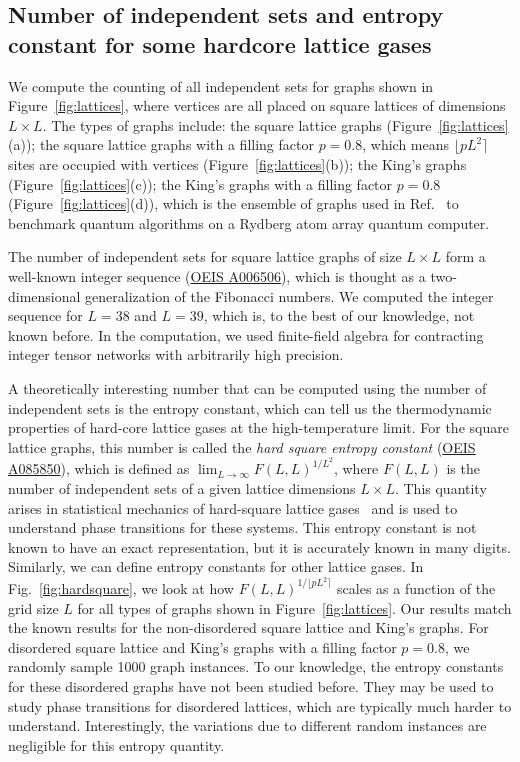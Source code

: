 \documentclass[onefignum, onetabnum]{siamart190516}
\newcommand{\<}{\langle}
\renewcommand{\>}{\rangle}
\newcommand{\Fig}[1]{Fig.~\ref{#1}}
\newcommand{\blue}[1]{[{\bf  \color{blue}{JG: #1}}]}
\newcounter{example}
\begin{document}
\subsection{Number of independent sets and entropy constant for some hardcore lattice gases}\label{sec:entropy}
We compute the counting of all independent sets for graphs shown in Figure~\ref{fig:lattices}, where vertices are all placed on square lattices of dimensions $L \times L$.
The types of graphs include: the square lattice graphs (Figure~\ref{fig:lattices}(a)); the square lattice graphs with a filling factor $p=0.8$, which means $\lfloor pL^{2} \rceil$ sites are occupied with vertices  (Figure~\ref{fig:lattices}(b));
the King's graphs  (Figure~\ref{fig:lattices}(c)); the King's graphs with a filling factor $p = 0.8$  (Figure~\ref{fig:lattices}(d)), which is the ensemble of graphs used in Ref.~\cite{Ebadi2022} to benchmark quantum algorithms on a Rydberg atom array quantum computer. 

The number of independent sets for square lattice graphs of size $L \times L$ form a well-known integer sequence (\href{https://oeis.org/A006506}{OEIS A006506}), which is thought as a two-dimensional generalization of the Fibonacci numbers.
We computed the integer sequence for $L=38$ and $L=39$, which is, to the best of our knowledge, not known before.
In the computation, we used finite-field algebra for contracting integer tensor networks with arbitrarily high precision. 

A theoretically interesting number that can be computed using the number of independent sets is the entropy constant, which can tell us the thermodynamic properties of hard-core lattice gases at the high-temperature limit.
For the square lattice graphs, this number is called the \textit{hard square entropy constant} (\href{https://oeis.org/A085850}{OEIS A085850}), which is defined as $\lim_{L\rightarrow \infty} F(L,L)^{1/L^2}$, where $F(L,L)$ is the number of independent sets of a given lattice dimensions $L \times L$.
This quantity arises in statistical mechanics of hard-square lattice gases~\cite{Baxter1980, Pearce1988} and is used to understand phase transitions for these systems. This entropy constant is not known to have an exact representation, but it is accurately known in many digits. Similarly, we can define entropy constants for other lattice gases. In \Fig{fig:hardsquare}, we look at how $F(L,L)^{1/\lfloor pL^2\rceil}$ scales as a function of the grid size $L$ for all types of graphs shown in Figure~\ref{fig:lattices}. Our results match the known results for the non-disordered square lattice and King's graphs. For disordered square lattice and King's graphs with a filling factor $p=0.8$, we randomly sample 1000 graph instances. To our knowledge, the entropy constants for these disordered graphs have not been studied before. They may be used to study phase transitions for disordered lattices, which are typically much harder to understand. Interestingly, the variations due to different random instances are negligible for this entropy quantity. 
\end{document}
